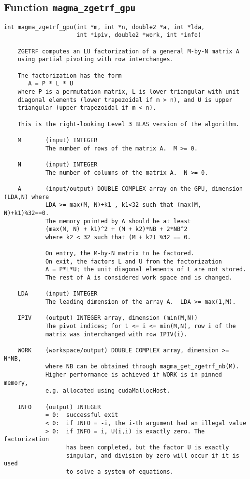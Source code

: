 \documentclass[10pt]{book}
\begin{document}
\newpage
\subsection{Function {\tt {\bf magma\_zgetrf\_gpu}}}
\begin{verbatim}
int magma_zgetrf_gpu(int *m, int *n, double2 *a, int *lda, 
                     int *ipiv, double2 *work, int *info)
   
    ZGETRF computes an LU factorization of a general M-by-N matrix A   
    using partial pivoting with row interchanges.   

    The factorization has the form   
       A = P * L * U   
    where P is a permutation matrix, L is lower triangular with unit   
    diagonal elements (lower trapezoidal if m > n), and U is upper   
    triangular (upper trapezoidal if m < n).   

    This is the right-looking Level 3 BLAS version of the algorithm.   

    M       (input) INTEGER   
            The number of rows of the matrix A.  M >= 0.   

    N       (input) INTEGER   
            The number of columns of the matrix A.  N >= 0.   

    A       (input/output) DOUBLE COMPLEX array on the GPU, dimension (LDA,N) where
            LDA >= max(M, N)+k1 , k1<32 such that (max(M, N)+k1)%32==0.
            The memory pointed by A should be at least 
            (max(M, N) + k1)^2 + (M + k2)*NB + 2*NB^2
            where k2 < 32 such that (M + k2) %32 == 0.
                 
            On entry, the M-by-N matrix to be factored.   
            On exit, the factors L and U from the factorization   
            A = P*L*U; the unit diagonal elements of L are not stored.   
            The rest of A is considered work space and is changed.

    LDA     (input) INTEGER   
            The leading dimension of the array A.  LDA >= max(1,M).   

    IPIV    (output) INTEGER array, dimension (min(M,N))   
            The pivot indices; for 1 <= i <= min(M,N), row i of the   
            matrix was interchanged with row IPIV(i).   

    WORK    (workspace/output) DOUBLE COMPLEX array, dimension >= N*NB,
            where NB can be obtained through magma_get_zgetrf_nb(M).
            Higher performance is achieved if WORK is in pinned memory, 
            e.g. allocated using cudaMallocHost.

    INFO    (output) INTEGER   
            = 0:  successful exit   
            < 0:  if INFO = -i, the i-th argument had an illegal value   
            > 0:  if INFO = i, U(i,i) is exactly zero. The factorization   
                  has been completed, but the factor U is exactly   
                  singular, and division by zero will occur if it is used   
                  to solve a system of equations.   
\end{verbatim}
\end{document}

